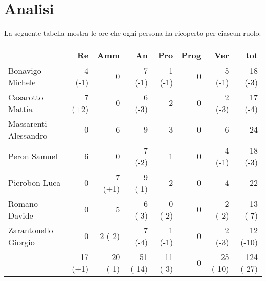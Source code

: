 \section{Analisi}

La seguente tabella mostra le ore che ogni persona ha ricoperto per ciascun ruolo:
\begin{table}[ht]
    \begin{tabularx}{\linewidth}{X|rrrrrrr}
    \rowcolor{gray!30}& Re & Amm & An & Pro & Prog & Ver & tot \\
    \hline
    Bonavigo Michele                        & 4 (-1)   & 0          & 7 (-1)       & 1 (-1)     & 0     & 5 (-1)   & 18 (-3) \\

    \rowcolor{gray!10}Casarotto Mattia      & 7 (+2)   & 0          & 6 (-3)       & 2          & 0     & 2 (-3)   & 17 (-4) \\

    Massarenti Alessandro                   & 0        & 6          & 9            & 3          & 0     & 6        & 24 \\ 

    \rowcolor{gray!10}Peron Samuel          & 6        & 0          & 7 (-2)       & 1          & 0     & 4 (-1)   & 18 (-3) \\ 

    Pierobon Luca                           & 0        & 7 (+1)     & 9 (-1)       & 2          & 0     & 4        & 22 \\ 

    \rowcolor{gray!10}Romano Davide         & 0        & 5          & 6 (-3)       & 0 (-2)     & 0     & 2 (-2)   & 13 (-7)\\

    Zarantonello Giorgio                    & 0        & 2 (-2)     & 7 (-4)       & 1 (-1)     & 0     & 2 (-3)   & 12 (-10)\\

    \hline                                  & 17 (+1)  & 20 (-1)    & 51 (-14)     & 11 (-3)    & 0     & 25 (-10)  & 124 (-27)\\  
    \end{tabularx}
\end{table}

